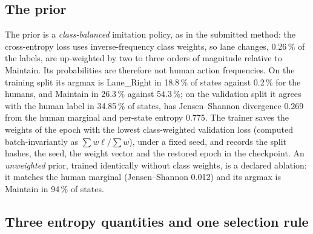 \subsection{The prior}
\label{sec:contract_prior}

The prior is a \emph{class-balanced} imitation policy, as in the submitted method: the cross-entropy loss uses inverse-frequency class weights, so lane changes, 0.26\,\% of the labels, are up-weighted by two to three orders of magnitude relative to Maintain. Its probabilities are therefore not human action frequencies. On the training split its argmax is Lane\_Right in 18.8\,\% of states against 0.2\,\% for the humans, and Maintain in 26.3\,\% against 54.3\,\%; on the validation split it agrees with the human label in 34.85\,\% of states, has Jensen--Shannon divergence 0.269 from the human marginal and per-state entropy 0.775. The trainer saves the weights of the epoch with the lowest class-weighted validation loss (computed batch-invariantly as $\sum w\ell / \sum w$), under a fixed seed, and records the split hashes, the seed, the weight vector and the restored epoch in the checkpoint. An \emph{unweighted} prior, trained identically without class weights, is a declared ablation: it matches the human marginal (Jensen--Shannon 0.012) and its argmax is Maintain in 94\,\% of states.

\subsection{Three entropy quantities and one selection rule}
\label{sec:contract_entropy}

